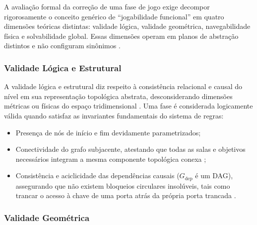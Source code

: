 A avaliação formal da correção de uma fase de jogo exige decompor rigorosamente o conceito genérico de ``jogabilidade funcional'' em quatro dimensões teóricas distintas: validade lógica, validade geométrica, navegabilidade física e solvabilidade global. Essas dimensões operam em planos de abstração distintos e não configuram sinônimos \cite{dormans2010, linden2013designing, linden2014dungeons, sun2024roomplanner, xu2025constraint}.

\subsubsection{Validade Lógica e Estrutural}
\label{sec:validade_logica}

A validade lógica e estrutural diz respeito à consistência relacional e causal do nível em sua representação topológica abstrata, desconsiderando dimensões métricas ou físicas do espaço tridimensional \cite{dormans2010, linden2013designing, linden2014dungeons}. Uma fase é considerada logicamente válida quando satisfaz as invariantes fundamentais do sistema de regras:
\begin{itemize}
    \item Presença de nós de início e fim devidamente parametrizados;
    \item Conectividade do grafo subjacente, atestando que todas as salas e objetivos necessários integram a mesma componente topológica conexa \cite{linden2014dungeons, xu2025databasedrivenframework3dlevel};
    \item Consistência e aciclicidade das dependências causais ($G_{\text{dep}}$ é um DAG), assegurando que não existem bloqueios circulares insolúveis, tais como trancar o acesso à chave de uma porta atrás da própria porta trancada \cite{dormans2010, linden2014dungeons, xu2025databasedrivenframework3dlevel}.
\end{itemize}

\subsubsection{Validade Geométrica}
\label{sec:validade_geometrica}

